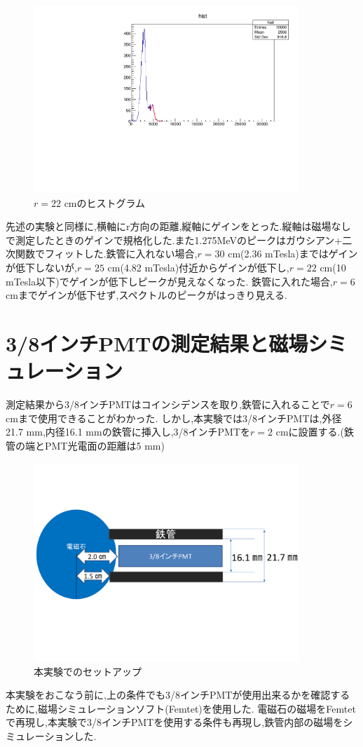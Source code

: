 \begin{figure}[H]
	\centering
		\includegraphics[angle=-90,width=10cm]{fig/iguchi/minicoout22.pdf}
	\caption{$r=22$ cmのヒストグラム}
	\label{histminicoout22}
\end{figure}
先述の実験と同様に,横軸にr方向の距離,縦軸にゲインをとった.縦軸は磁場なしで測定したときのゲインで規格化した.また1.275MeVのピークはガウシアン+二次関数でフィットした.鉄管に入れない場合,$r=30$ cm(2.36 mTesla)まではゲインが低下しないが,$r=25$ cm(4.82 mTesla)付近からゲインが低下し,$r=22$ cm(10 mTesla以下)でゲインが低下しピークが見えなくなった.
鉄管に入れた場合,$r=6$ cmまでゲインが低下せず,スペクトルのピークがはっきり見える.


\section{3/8インチPMTの測定結果と磁場シミュレーション}
測定結果から3/8インチPMTはコインシデンスを取り,鉄管に入れることで$r=6$ cmまで使用できることがわかった.
しかし,本実験では3/8インチPMTは,外径21.7 mm,内径16.1 mmの鉄管に挿入し,3/8インチPMTを$r=2$ cmに設置する.(鉄管の端とPMT光電面の距離は5 mm)
\begin{figure}[H]
	\centering
		\includegraphics[width=10cm]{fig/iguchi/honjikken.pdf}
	\caption{本実験でのセットアップ}
	\label{honjikken}
\end{figure}
本実験をおこなう前に,上の条件でも3/8インチPMTが使用出来るかを確認するために,磁場シミュレーションソフト(Femtet)を使用した.
電磁石の磁場をFemtetで再現し,本実験で3/8インチPMTを使用する条件も再現し,鉄管内部の磁場をシミュレーションした.

